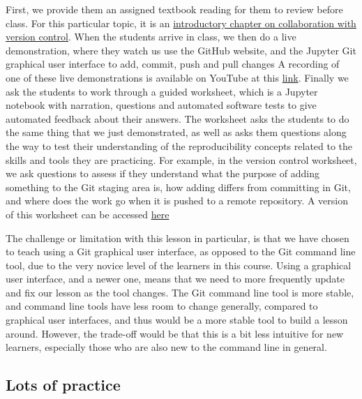 \documentclass[
  12 pt,
]{paper}
\begin{document}
First, we provide them an assigned textbook reading
for them to review before class.
For this particular topic, it is an \href{https://ubc-dsci.github.io/introduction-to-datascience/Getting-started-with-version-control.html}{introductory chapter
on collaboration with version control}.
When the students arrive in class,
we then do a live demonstration,
where they watch us use the GitHub website,
and the Jupyter Git graphical user interface to add, commit,
push and pull changes
A recording of one of these live demonstrations is available on YouTube at this \href{https://youtu.be/attPo4zEElU}{link}.
Finally we ask the students to work through a
guided worksheet, which is a Jupyter notebook with narration, questions and automated software tests to give automated feedback about their answers.
The worksheet asks the students to do
the same thing that we just demonstrated,
as well as asks them questions along the way
to test their understanding of the reproducibility concepts
related to the skills and tools they are practicing.
For example, in the version control worksheet, we ask questions to assess
if they understand what the purpose of adding something to the Git staging area is,
how adding differs from committing in Git,
and where does the work go when it is pushed to a remote repository.
A version of this worksheet can be accessed \href{https://github.com/UBC-DSCI/dsci-100-assets/blob/master/2021-summer/materials/worksheet_05/worksheet_05.ipynb}{here}

The challenge or limitation with this lesson in particular,
is that we have chosen to teach using a Git graphical user interface,
as opposed to the Git command line tool,
due to the very novice level of the learners in this course.
Using a graphical user interface, and a newer one,
means that we need to more frequently update
and fix our lesson as the tool changes.
The Git command line tool is more stable, and command line tools have less
room to change generally, compared to graphical user interfaces,
and thus would be a more stable tool to build a lesson around.
However, the trade-off would be that this is a bit less intuitive for new learners,
especially those who are also new to the command line in general.

\hypertarget{lots-of-practice}{%
\subsection{Lots of practice}\label{lots-of-practice}}
\end{document}
